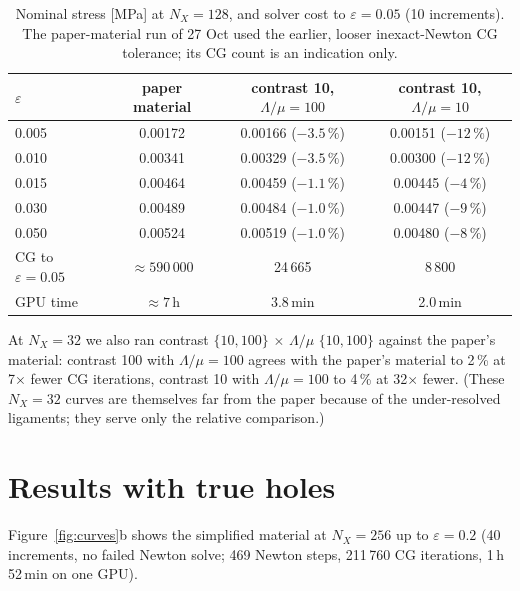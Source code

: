 \documentclass[11pt,a4paper]{article}
\begin{document}
\begin{table}[h]
\centering
\caption{Nominal stress [MPa] at $N_X = 128$, and solver cost to $\varepsilon = 0.05$ (10 increments).
The paper-material run of 27 Oct used the earlier, looser inexact-Newton CG tolerance; its CG count is an
indication only.}
\label{tab:simplify128}
\begin{tabular}{lccc}
\toprule
$\varepsilon$ & paper material & contrast 10, $\Lambda/\mu = 100$ & contrast 10, $\Lambda/\mu = 10$ \\
\midrule
0.005 & 0.00172 & 0.00166 ($-3.5\,\%$) & 0.00151 ($-12\,\%$) \\
0.010 & 0.00341 & 0.00329 ($-3.5\,\%$) & 0.00300 ($-12\,\%$) \\
0.015 & 0.00464 & 0.00459 ($-1.1\,\%$) & 0.00445 ($-4\,\%$) \\
0.030 & 0.00489 & 0.00484 ($-1.0\,\%$) & 0.00447 ($-9\,\%$) \\
0.050 & 0.00524 & 0.00519 ($-1.0\,\%$) & 0.00480 ($-8\,\%$) \\
\midrule
CG to $\varepsilon = 0.05$ & $\approx 590\,000$ & 24\,665 & 8\,800 \\
GPU time & $\approx 7$\,h & 3.8\,min & 2.0\,min \\
\bottomrule
\end{tabular}
\end{table}

At $N_X = 32$ we also ran contrast $\{10, 100\}$ $\times$ $\Lambda/\mu$ $\{10, 100\}$ against the paper's material:
contrast 100 with $\Lambda/\mu = 100$ agrees with the paper's material to 2\,\% at 7$\times$ fewer CG iterations,
contrast 10 with $\Lambda/\mu = 100$ to 4\,\% at 32$\times$ fewer. (These $N_X = 32$ curves are themselves far from
the paper because of the under-resolved ligaments; they serve only the relative comparison.)

\section{Results with true holes}

Figure~\ref{fig:curves}b shows the simplified material at $N_X = 256$ up to $\varepsilon = 0.2$
(40 increments, no failed Newton solve; 469 Newton steps, 211\,760 CG iterations, 1\,h\,52\,min on one GPU).
\end{document}

